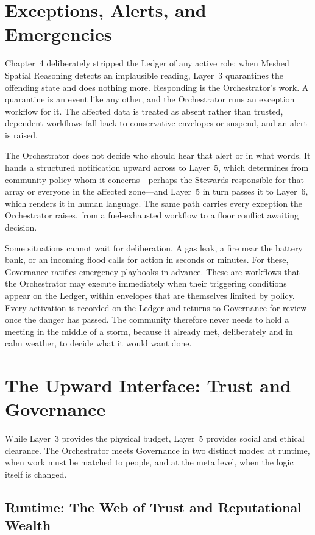 \section{Exceptions, Alerts, and Emergencies}

Chapter~4 deliberately stripped the Ledger of any active role: when Meshed Spatial Reasoning detects an implausible reading, Layer~3 quarantines the offending state and does nothing more. Responding is the Orchestrator's work. A quarantine is an event like any other, and the Orchestrator runs an exception workflow for it. The affected data is treated as absent rather than trusted, dependent workflows fall back to conservative envelopes or suspend, and an alert is raised.

The Orchestrator does not decide who should hear that alert or in what words. It hands a structured notification upward across  to Layer~5, which determines from community policy whom it concerns—perhaps the Stewards responsible for that array or everyone in the affected zone—and Layer~5 in turn passes it to Layer~6, which renders it in human language. The same path carries every exception the Orchestrator raises, from a fuel-exhausted workflow to a floor conflict awaiting decision.

Some situations cannot wait for deliberation. A gas leak, a fire near the battery bank, or an incoming flood calls for action in seconds or minutes. For these, Governance ratifies emergency playbooks in advance. These are workflows that the Orchestrator may execute immediately when their triggering conditions appear on the Ledger, within envelopes that are themselves limited by policy. Every activation is recorded on the Ledger and returns to Governance for review once the danger has passed. The community therefore never needs to hold a meeting in the middle of a storm, because it already met, deliberately and in calm weather, to decide what it would want done.

\section{The Upward Interface: Trust and Governance}

While Layer~3 provides the physical budget, Layer~5 provides social and ethical clearance. The Orchestrator meets Governance in two distinct modes: at runtime, when work must be matched to people, and at the meta level, when the logic itself is changed.

\subsection{Runtime: The Web of Trust and Reputational Wealth}

